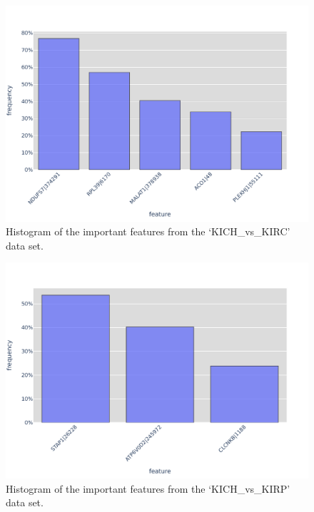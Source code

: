 \begin{figure}[H]
    \centering
    \includegraphics[width=0.9\columnwidth]{figures/genes/featureHistogram_TCGA_KICH_vs_KIRC.pdf}
    \caption{Histogram of the important features from the `KICH\_vs\_KIRC' data set.}\label{fig:histKICHvsKIRC}
\end{figure}
\begin{figure}[H]
    \centering
    \includegraphics[width=0.9\columnwidth]{figures/genes/featureHistogram_TCGA_KICH_vs_KIRP.pdf}
    \caption{Histogram of the important features from the `KICH\_vs\_KIRP' data set.}\label{fig:histKICHvsKIRP}
\end{figure}
